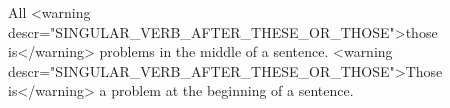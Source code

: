 
    All <warning descr="SINGULAR_VERB_AFTER_THESE_OR_THOSE">those is</warning> problems in the middle of a sentence.
    <warning descr="SINGULAR_VERB_AFTER_THESE_OR_THOSE">Those is</warning> a problem at the beginning of a sentence.
